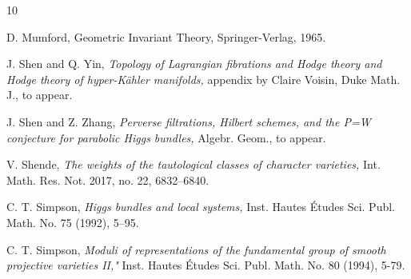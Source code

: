 \documentclass[11pt]{amsart}
\theoremstyle{plain}
\theoremstyle{definition}
\theoremstyle{remark}
\begin{document}
\begin{thebibliography}{10}




 D. Mumford, Geometric Invariant Theory, Springer-Verlag, 1965.

 J. Shen and Q. Yin, {\em Topology of Lagrangian fibrations and Hodge theory and Hodge theory of hyper-K\"ahler manifolds,} appendix by Claire Voisin, Duke Math. J., to appear.

 J. Shen and Z. Zhang, {\em Perverse filtrations, Hilbert schemes, and the P=W conjecture for parabolic Higgs bundles,} Algebr. Geom., to appear.

 V. Shende, {\em The weights of the tautological classes of character varieties,} Int. Math. Res. Not. 2017, no. 22, 6832--6840.




 C. T. Simpson, {\em Higgs bundles and local systems,} Inst. Hautes \'Etudes Sci. Publ. Math. No. 75 (1992), 5--95.

 C. T. Simpson, {\em Moduli of representations of the fundamental group of smooth projective varieties II,"} Inst. Hautes \'Etudes Sci. Publ. Math.   No. 80 (1994), 5-79.




\end{thebibliography}
\end{document}
